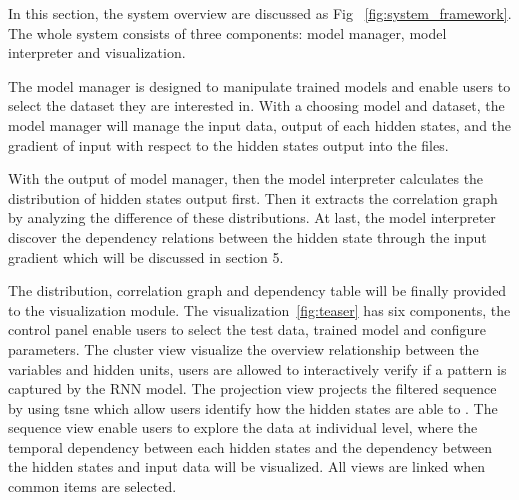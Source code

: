 In this section, the system overview are discussed as Fig ~\ref{fig:system_framework}. The whole system consists of three components: model manager, model interpreter and visualization. 

The model manager is designed to manipulate trained models and enable users to select the dataset they are interested in. With a choosing model and dataset, the model manager will manage the input data, output of each hidden states, and the gradient of input with respect to the hidden states output into the files.    

With the output of model manager, then the model interpreter calculates the distribution of hidden states output first. Then it extracts the correlation graph by analyzing the difference of these distributions. At last, the model interpreter discover the dependency relations between the hidden state through the input gradient which will be discussed in section 5. 

The distribution, correlation graph and dependency table will be finally provided to the visualization module. The visualization~\ref{fig:teaser} has six components, the control panel enable users to select the test data, trained model and configure parameters. The cluster view visualize the overview relationship between the variables and hidden units, users are allowed to interactively verify if a pattern is captured by the RNN model. The projection view projects the filtered sequence by using tsne which allow users identify how the hidden states are able to . The sequence view enable users to explore the data at individual level, where the temporal dependency between each hidden states and the dependency between the hidden states and input data will be visualized. All views are linked when common items are selected. 

